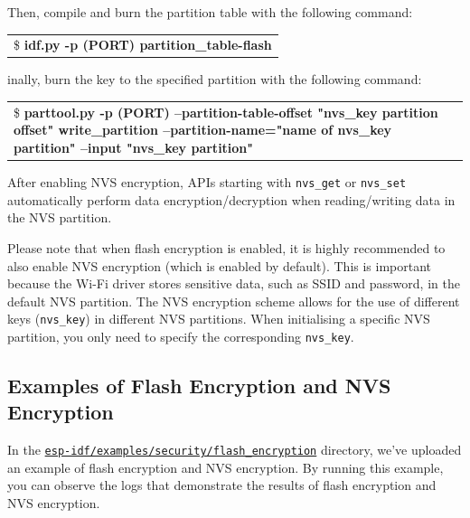 \documentclass[a4paper,12pt,openany]{book}
\renewcommand{\ttfamily}{\fontfamily{pcr}\selectfont}
\renewcommand{\arraystretch}{1}
\newenvironment{codebloc}{ %
    \ttfamily\footnotesize
    \renewcommand{\arraystretch}{1}
}
\newcommand{\note}[2][NOTE]{ %
\vspace{6pt}
\begin{tabular}{b{\textwidth}}
\hline
\fontfamily{phv}\selectfont \textbf{#1}\\
\leftskip 1em #2\\
\hline
\end{tabular}
}
\begin{document}
\begin{itemize}[leftmargin=1em]
    Then, compile and burn the partition table with the following command:
    
    \begin{codebloc}
    \begin{tabular}{a}
    \$ \textbf{idf.py -p (PORT) partition\_table-flash}
    \end{tabular}
    \end{codebloc}
    
    Finally, burn the key to the specified partition with the following command:
    
    \begin{codebloc}
    \begin{tabular}{a}
    \$ \textbf{parttool.py -p (PORT) --partition-table-offset "nvs\_key partition offset" write\_partition --partition-name="name of nvs\_key partition" --input "nvs\_key partition"}
    \end{tabular}
    \end{codebloc}

    \item After enabling NVS encryption, APIs starting with \verb|nvs_get| or \verb|nvs_set| automatically perform data encryption/decryption when reading/writing data in the NVS partition.
\end{itemize}

Please note that when flash encryption is enabled, it is highly recommended to also enable NVS encryption (which is enabled by default). This is important because the Wi-Fi driver stores sensitive data, such as SSID and password, in the default NVS partition. The NVS encryption scheme allows for the use of different keys (\verb|nvs_key|) in different NVS partitions. When initialising a specific NVS partition, you only need to specify the corresponding \verb|nvs_key|. 


\subsection{Examples of Flash Encryption and NVS Encryption}
In the \href{https://github.com/espressif/esp-idf/tree/master/examples/security/flash_encryption}{\texttt{esp-idf/examples/security/flash\_encryption}} directory, we’ve uploaded an example of flash encryption and NVS encryption. By running this example, you can observe the logs that demonstrate the results of flash encryption and NVS encryption.
\end{document}
